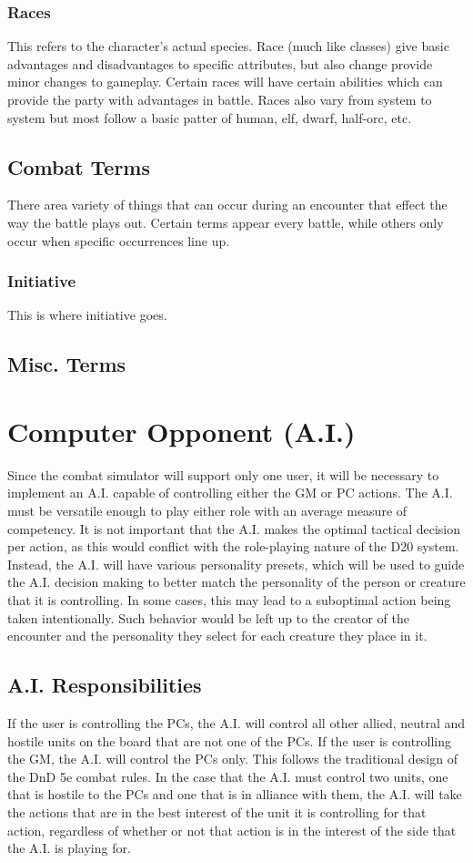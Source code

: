 \documentclass[12pt,a4paper]{report}
\begin{document}
			\subsubsection{Races}
				This refers to the character's actual species. Race (much like classes) give basic advantages and disadvantages to specific attributes, but also change provide minor changes to gameplay. Certain races will have certain abilities which can provide the party with advantages in battle. Races also vary from system to system but most follow a basic patter of human, elf, dwarf, half-orc, etc.
		\subsection{Combat Terms}
			There area variety of things that can occur during an encounter that effect the way the battle plays out. Certain terms appear every battle, while others only occur when specific occurrences line up.
			\subsubsection{Initiative}
			This is where initiative goes.
		\subsection{Misc. Terms}
	\section{Computer Opponent (A.I.)}
	Since the combat simulator will support only one user, it will be necessary to implement an A.I. capable of controlling either the GM or PC actions. The A.I. must be versatile enough to play either role with an average measure of competency. It is not important that the A.I. makes the optimal tactical decision per action, as this would conflict with the role-playing nature of the D20 system. Instead, the A.I. will have various personality presets, which will be used to guide the A.I. decision making to better match the personality of the person or creature that it is controlling. In some cases, this may lead to a suboptimal action being taken intentionally. Such behavior would be left up to the creator of the encounter and the personality they select for each creature they place in it.
	
		\subsection{A.I. Responsibilities}
		If the user is controlling the PCs, the A.I. will control all other allied, neutral and hostile units on the board that are not one of the PCs. If the user is controlling the GM, the A.I. will control the PCs only. This follows the traditional design of the DnD 5e combat rules. In the case that the A.I. must control two units, one that is hostile to the PCs and one that is in alliance with them, the A.I. will take the actions that are in the best interest of the unit it is controlling for that action, regardless of whether or not that action is in the interest of the side that the A.I. is playing for. 
		
\end{document}
